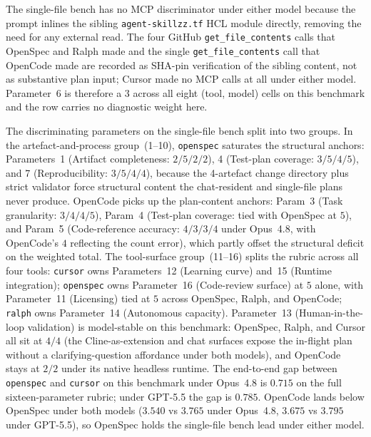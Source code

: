 The single-file bench has no MCP discriminator under either model because
the prompt inlines the sibling \texttt{agent-skillzz.tf} HCL module
directly, removing the need for any external read. The four GitHub
\texttt{get\_file\_contents} calls that OpenSpec and Ralph made and
the single \texttt{get\_file\_contents} call that OpenCode made are
recorded as SHA-pin verification of the sibling content, not as
substantive plan input; Cursor made no MCP calls at all under
either model. Parameter~6 is therefore a $3$ across all eight
(tool, model) cells on this benchmark and the row carries no
diagnostic weight here.

The discriminating parameters on the single-file bench split into two
groups. In the artefact-and-process group~(1--10), \texttt{openspec}
saturates the structural anchors: Parameters~1 (Artifact
completeness: $2/5/2/2$), 4 (Test-plan coverage: $3/5/4/5$), and
7 (Reproducibility: $3/5/4/4$), because the 4-artefact change
directory plus strict validator force structural content the
chat-resident and single-file plans never produce. OpenCode picks
up the plan-content anchors: Param~3 (Task granularity: $3/4/4/5$),
Param~4 (Test-plan coverage: tied with OpenSpec at $5$), and Param~5
(Code-reference accuracy: $4/3/3/4$ under Opus~4.8, with OpenCode's $4$
reflecting the count error), which partly offset the structural
deficit on the weighted total. The
tool-surface group~(11--16) splits the rubric across all four
tools: \texttt{cursor} owns Parameters~12 (Learning curve) and~15
(Runtime integration); \texttt{openspec} owns Parameter~16
(Code-review surface) at $5$ alone, with Parameter~11 (Licensing)
tied at $5$ across OpenSpec, Ralph, and OpenCode; \texttt{ralph}
owns Parameter~14 (Autonomous capacity). Parameter~13
(Human-in-the-loop validation) is model-stable on this benchmark:
OpenSpec, Ralph, and Cursor all sit at $4/4$ (the Cline-as-extension
and chat surfaces expose the in-flight plan without a
clarifying-question affordance under both models), and OpenCode stays
at $2/2$ under its native headless runtime. The end-to-end gap
between \texttt{openspec} and \texttt{cursor} on this benchmark
under Opus~4.8 is $0.715$ on the full sixteen-parameter rubric; under
GPT-5.5 the gap is $0.785$. OpenCode lands below OpenSpec under both
models ($3.540$ vs $3.765$ under Opus~4.8, $3.675$ vs $3.795$ under
GPT-5.5), so OpenSpec holds the single-file bench lead under either model.
